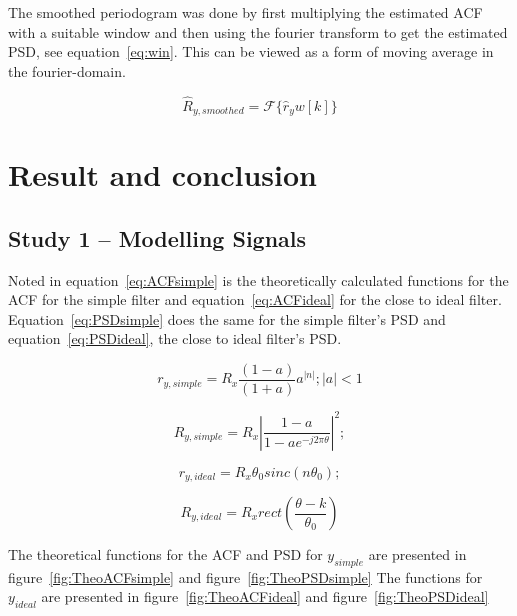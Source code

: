 \documentclass[10pt]{article}
\begin{document}
The smoothed periodogram was done by first multiplying the estimated ACF with a
 suitable window and then using the fourier transform to get the estimated PSD,
 see equation~\ref{eq:win}. This can be viewed as a form of moving average in the fourier-domain.

 \begin{equation}
 \label{eq:win}
 \hat{R}_{y,smoothed} = \mathcal{F}\{\hat{r}_yw[k]\}
 \end{equation}


\section{Result and conclusion}
\subsection{Study 1 – Modelling Signals}

Noted in equation~\ref{eq:ACFsimple} is the theoretically calculated functions for the ACF
for the simple filter and equation~\ref{eq:ACFideal} for the close to ideal filter.
Equation~\ref{eq:PSDsimple} does the same for the simple filter's PSD
and equation~\ref{eq:PSDideal}, the close to ideal filter's PSD.

\begin{equation}
  \label{eq:ACFsimple}
  r_{y,simple} = R_x\frac{(1-a)}{(1+a)}a^{|n|};  |a| < 1
\end{equation}

\begin{equation}
  \label{eq:PSDsimple}
  R_{y,simple} =  R_x|\frac{1-a}{1-ae^{-j2\pi\theta}}|^2;
\end{equation}

\begin{equation}
  \label{eq:ACFideal}
  r_{y,ideal} = R_x\theta_{0}sinc(n\theta_0);
\end{equation}

\begin{equation}
  \label{eq:PSDideal}
  R_{y,ideal} = R_xrect(\frac{\theta - k}{\theta_0})
\end{equation}


The theoretical functions for the ACF and PSD for $y_{simple}$ are presented
in figure~\ref{fig:TheoACFsimple} and figure~\ref{fig:TheoPSDsimple}
The functions for $y_{ideal}$ are presented in figure~\ref{fig:TheoACFideal} and
figure~\ref{fig:TheoPSDideal}
\end{document}

